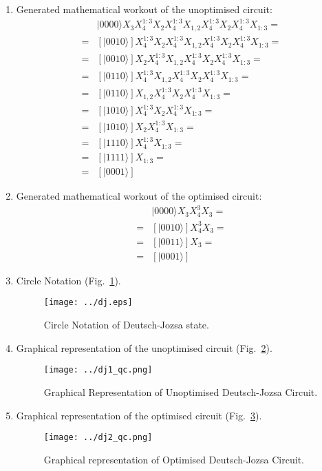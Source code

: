 \documentclass[sigconf,natbib=false]{acmart}
\begin{document}
\begin{enumerate}
\item Generated mathematical workout of the unoptimised circuit:
\begin{align*}
&|0000\rangle X_{3}X_{4}^{1:3}X_{2}X_{4}^{1:3}X_{1,2}X_{4}^{1:3}X_{2}X_{4}^{1:3}X_{1:3}=\\
=& [ |0010\rangle ]X_{4}^{1:3}X_{2}X_{4}^{1:3}X_{1,2}X_{4}^{1:3}X_{2}X_{4}^{1:3}X_{1:3}=\\
=& [ |0010\rangle ]X_{2}X_{4}^{1:3}X_{1,2}X_{4}^{1:3}X_{2}X_{4}^{1:3}X_{1:3}=\\
=& [ |0110\rangle ]X_{4}^{1:3}X_{1,2}X_{4}^{1:3}X_{2}X_{4}^{1:3}X_{1:3}=\\
=& [ |0110\rangle ]X_{1,2}X_{4}^{1:3}X_{2}X_{4}^{1:3}X_{1:3}=\\
=& [ |1010\rangle ]X_{4}^{1:3}X_{2}X_{4}^{1:3}X_{1:3}=\\
=& [ |1010\rangle ]X_{2}X_{4}^{1:3}X_{1:3}=\\
=& [ |1110\rangle ]X_{4}^{1:3}X_{1:3}=\\
=& [ |1111\rangle ]X_{1:3}=\\
=& [ |0001\rangle ]
\end{align*}

\item Generated mathematical workout of the optimised circuit:
\begin{align*}
&|0000\rangle X_{3}X_{4}^{3}X_{3}=\\
=& [ |0010\rangle ]X_{4}^{3}X_{3}=\\
=& [ |0011\rangle ]X_{3}=\\
=& [ |0001\rangle ]
\end{align*}

\item Circle Notation (Fig.~\ref{dj}).
\begin{figure}[!htb]
\centerline{\texttt{[image: ../dj.eps]}}
\caption{Circle Notation of Deutsch-Jozsa state.}
\label{dj}
\end{figure}

\item Graphical representation of the unoptimised circuit (Fig.~\ref{dj1_qc}).
\begin{figure}[!ht]
\centerline{\texttt{[image: ../dj1\_qc.png]}}
\caption{Graphical Representation of Unoptimised Deutsch-Jozsa Circuit.}
\label{dj1_qc}
\end{figure}

\item Graphical representation of the optimised circuit (Fig.~\ref{dj2_qc}).
\begin{figure}[!ht]
\centerline{\texttt{[image: ../dj2\_qc.png]}}
\caption{Graphical representation of Optimised Deutsch-Jozsa Circuit.}
\label{dj2_qc}
\end{figure}
\end{enumerate}
\end{document}
